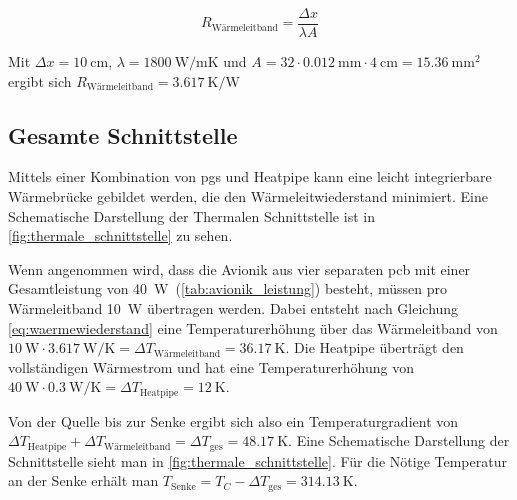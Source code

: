 \begin{equation*}
  R_\mathrm{Wärmeleitband} = \frac{\Delta x}{\lambda A}
\end{equation*}

Mit $\Delta x = \SI{10}{\centi\meter}$, $\lambda = \SI{1800}{\watt\per\meter\kelvin}$ und $A = 32 \cdot \SI{0,012}{\milli\meter} \cdot \SI{4}{\centi\meter} = \SI{15,36}{\milli\meter\squared}$
ergibt sich $R_\mathrm{Wärmeleitband} = \SI{3,617}{\kelvin\per\watt}$

\subsection{Gesamte Schnittstelle}\label{sec:gesamte_schnittstelle}

Mittels einer Kombination von \ac{pgs} und Heatpipe kann eine leicht integrierbare Wärmebrücke gebildet werden, die den Wärmeleitwiederstand
minimiert. Eine Schematische Darstellung der Thermalen Schnittstelle ist in \ref{fig:thermale_schnittstelle} zu sehen.

Wenn angenommen wird, dass die Avionik aus vier separaten \ac{pcb} mit einer Gesamtleistung von \SI{40}{\watt}~(\ref{tab:avionik_leistung}) besteht, müssen pro Wärmeleitband \SI{10}{\watt} übertragen werden.
Dabei entsteht nach Gleichung \ref{eq:waermewiederstand} eine Temperaturerhöhung über das Wärmeleitband von $\SI{10}{\watt} \cdot \SI{3,617}{\watt\per\kelvin} = \Delta T_\mathrm{Wärmeleitband} = \SI{36,17}{\kelvin}$.
Die Heatpipe überträgt den vollständigen Wärmestrom und hat eine Temperaturerhöhung von $\SI{40}{\watt} \cdot \SI{0,3}{\watt\per\kelvin} = \Delta T_\mathrm{Heatpipe} = \SI{12}{\kelvin}$.

Von der Quelle bis zur Senke ergibt sich also ein Temperaturgradient von $\Delta T_\mathrm{Heatpipe} + \Delta T_\mathrm{Wärmeleitband} = \Delta T_\mathrm{ges} = \SI{48,17}{\kelvin}$.
Eine Schematische Darstellung der Schnittstelle sieht man in \ref{fig:thermale_schnittstelle}. Für die Nötige Temperatur an der Senke
erhält man $T_\mathrm{Senke} = T_C - \Delta T_\mathrm{ges} = \SI{314,13}{\kelvin}$.

